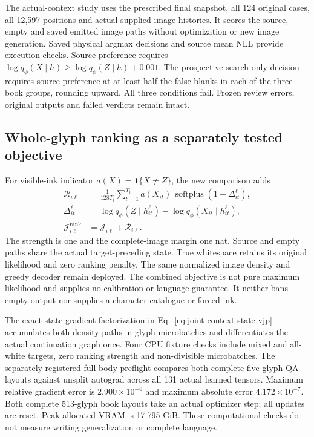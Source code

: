 \documentclass[12pt,a4paper]{article}
\providecommand{\DIFadd}[1]{{\protect\color{blue} \sf #1}} %
\begin{document}
\DIFadd{The actual-context study uses the prescribed final snapshot, all 124 original
cases, all 12,597 positions and actual supplied-image histories. It scores the
source, empty and saved emitted image paths without optimization or new image
generation. Saved physical argmax decisions and source mean NLL provide
execution checks. Source preference requires
$\log q_\phi(X\mid h)\ge\log q_\phi(Z\mid h)+0.001$. The prospective search-only
decision requires source preference at at least half the false blanks in each
of the three book groups, rounding upward. All three conditions fail. Frozen
review errors, original outputs and failed verdicts remain intact.
}

\subsection*{\DIFadd{Whole-glyph ranking as a separately tested objective}}

\DIFadd{For visible-ink indicator $a(X)=\mathbf1\{X\ne Z\}$, the new comparison adds
}\begin{equation}
 \begin{aligned}
 \mathcal R_{i\ell}
 &=\frac{1}{128T_i}\sum_{t=1}^{T_i} a(X_{it})\,
     \operatorname{softplus}\!\left(1+\Delta_{it}^{\ell}\right),\\
 \Delta_{it}^{\ell}
 &=\log q_\phi(Z\mid h_{it}^{\ell})
    -\log q_\phi(X_{it}\mid h_{it}^{\ell}),\\
 \mathcal J^{\mathrm{rank}}_{i\ell}
 &=\mathcal J_{i\ell}+\mathcal R_{i\ell}.
 \end{aligned}
 \label{eq:whole-glyph-ranking}
\end{equation}
\DIFadd{The strength is one and the complete-image margin one nat. Source and empty
paths share the actual target-preceding state. True whitespace retains its
original likelihood and zero ranking penalty. The same normalized image
density and greedy decoder remain deployed. The combined objective is not
pure maximum likelihood and supplies no calibration or language guarantee.
It neither bans empty output nor supplies a character catalogue or forced ink.
}

\DIFadd{The exact state-gradient factorization in Eq.~\ref{eq:joint-context-state-vjp}
accumulates both density paths in glyph microbatches and differentiates the
actual continuation graph once. Four CPU fixture checks include mixed and
all-white targets, zero ranking strength and non-divisible microbatches.
The separately registered full-body preflight compares both complete
five-glyph QA layouts against unsplit autograd across all 131 actual learned
tensors. Maximum relative gradient error is $2.900\times10^{-6}$ and maximum
absolute error $4.172\times10^{-7}$. Both complete 513-glyph book layouts take
an actual optimizer step; all updates are reset. Peak allocated VRAM is
17.795 GiB. These computational checks do not measure writing generalization
or complete language.
}
\end{document}
